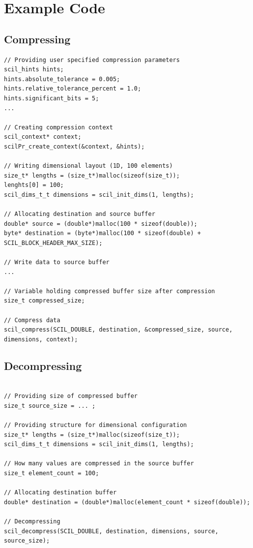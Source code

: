 \documentclass[
	12pt,
	a4paper,
	BCOR10mm,
	DIV14,
	headsepline,
]{scrreprt}
\begin{document}
\setcounter{footnote}{0}

\chapter{Example Code}


\section{Compressing}

\bigskip

\begin{lstlisting}[caption=Compression with SCIL, label={lst:comp}]
// Providing user specified compression parameters
scil_hints hints;
hints.absolute_tolerance = 0.005;
hints.relative_tolerance_percent = 1.0;
hints.significant_bits = 5;
...

// Creating compression context
scil_context* context;
scilPr_create_context(&context, &hints);

// Writing dimensional layout (1D, 100 elements)
size_t* lengths = (size_t*)malloc(sizeof(size_t));
lenghts[0] = 100;
scil_dims_t_t dimensions = scil_init_dims(1, lengths);

// Allocating destination and source buffer
double* source = (double*)malloc(100 * sizeof(double));
byte* destination = (byte*)malloc(100 * sizeof(double) + SCIL_BLOCK_HEADER_MAX_SIZE);

// Write data to source buffer
...

// Variable holding compressed buffer size after compression
size_t compressed_size;

// Compress data
scil_compress(SCIL_DOUBLE, destination, &compressed_size, source, dimensions, context);
\end{lstlisting}

\clearpage

\section{Decompressing}

\bigskip

\begin{lstlisting}[caption=Decompression with SCIL, label={lst:decomp}]

// Providing size of compressed buffer
size_t source_size = ... ;

// Providing structure for dimensional configuration
size_t* lengths = (size_t*)malloc(sizeof(size_t));
scil_dims_t_t dimensions = scil_init_dims(1, lengths);

// How many values are compressed in the source buffer
size_t element_count = 100;

// Allocating destination buffer
double* destination = (double*)malloc(element_count * sizeof(double));

// Decompressing
scil_decompress(SCIL_DOUBLE, destination, dimensions, source, source_size);
\end{lstlisting}
\end{document}
